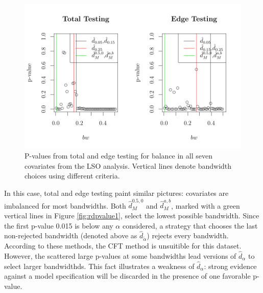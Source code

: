 \documentclass[12pt]{article}\usepackage[]{graphicx}\usepackage[]{color}
\makeatletter
\def\maxwidth{ %
  \ifdim\Gin@nat@width>\linewidth
    \linewidth
  \else
    \Gin@nat@width
  \fi
}
\newenvironment{knitrout}{}{} %
\newcommand{\dhat}{\hat{d}}
\makeatother
\begin{document}
\begin{figure}
\begin{knitrout}
\color{fgcolor}
\includegraphics[width=\maxwidth]{figure/rdd-1} 

\end{knitrout}
\caption{P-values from total and edge testing for balance in all seven covariates
  from the LSO analysis. Vertical lines denote bandwidth choices using
  different criteria.}
\label{fig:rdpvalues1}
\end{figure}

In this case, total and edge testing paint similar pictures:
covariates are imbalanced for most bandwidths.
Both $\dhat_M^{0.5,0}$ and $\dhat_M^{a,b}$, marked with a green vertical
lines in Figure \ref{fig:rdpvalue1}, select the lowest possible
bandwidth.
Since the first p-value 0.015 is below any $\alpha$
considered, a strategy that chooses the last non-rejected bandwidth
(denoted above as $\hat{d}_{\tilde{\alpha}}$) rejects every bandwidth.
According to these methods, the CFT method is unsuitible for this
dataset.
However, the scattered large p-values at some bandwidths lead versions
of $\dhat_\alpha$ to select larger bandwidthds.
This fact illustrates a weakness of $\dhat_\alpha$: strong evidence
against a model specification will be discarded in the presence of one
favorable p-value.
\end{document}
